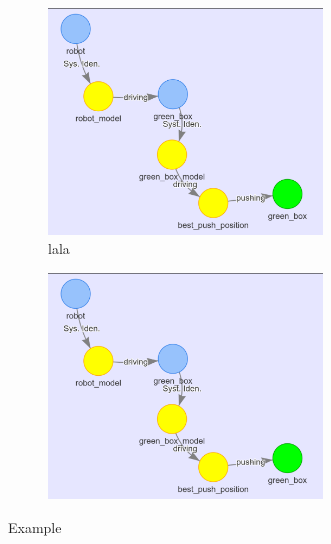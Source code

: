 \begin{figure}[H]
    \begin{subfigure}{.49\textwidth}
    \centering
    \includegraphics[width=0.8\textwidth]{figures/example_hyp_graph/6}
    \caption{lala}%
    \end{subfigure}
    \hfill
    \begin{subfigure}{.49\textwidth}
    \centering
    \includegraphics[width=0.8\textwidth]{figures/example_hyp_graph/6}
    \caption{}%
    \end{subfigure}

    \caption{Example }
    \label{fig:blocked_path_example_environment}
\end{figure}


